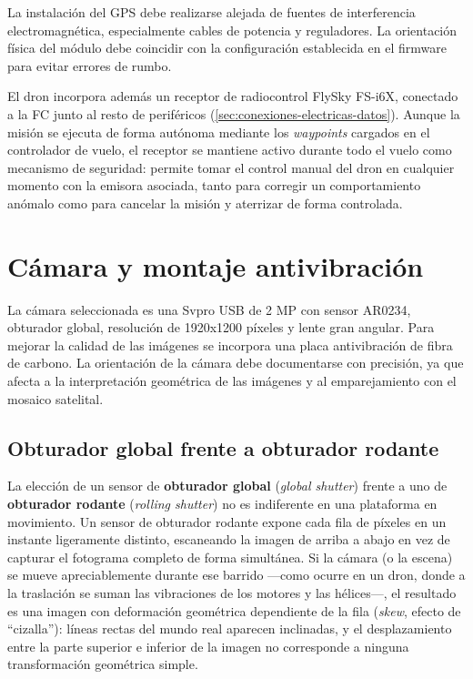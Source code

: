 La instalación del GPS debe realizarse alejada de fuentes de interferencia electromagnética, especialmente cables de potencia y reguladores. La orientación física del módulo debe coincidir con la configuración establecida en el firmware para evitar errores de rumbo.

El dron incorpora además un receptor de radiocontrol FlySky FS-i6X, conectado a la FC junto al resto de periféricos (\autoref{sec:conexiones-electricas-datos}). Aunque la misión se ejecuta de forma autónoma mediante los \textit{waypoints} cargados en el controlador de vuelo, el receptor se mantiene activo durante todo el vuelo como mecanismo de seguridad: permite tomar el control manual del dron en cualquier momento con la emisora asociada, tanto para corregir un comportamiento anómalo como para cancelar la misión y aterrizar de forma controlada.

\section{Cámara y montaje antivibración}
\label{sec:camara-montaje}

La cámara seleccionada es una Svpro USB de 2 MP con sensor AR0234, obturador global, resolución de 1920x1200 píxeles y lente gran angular. Para mejorar la calidad de las imágenes se incorpora una placa antivibración de fibra de carbono. La orientación de la cámara debe documentarse con precisión, ya que afecta a la interpretación geométrica de las imágenes y al emparejamiento con el mosaico satelital.

\subsection{Obturador global frente a obturador rodante}
\label{sec:global-vs-rolling-shutter}

La elección de un sensor de \textbf{obturador global} (\textit{global shutter}) frente a uno de \textbf{obturador rodante} (\textit{rolling shutter}) no es indiferente en una plataforma en movimiento. Un sensor de obturador rodante expone cada fila de píxeles en un instante ligeramente distinto, escaneando la imagen de arriba a abajo en vez de capturar el fotograma completo de forma simultánea. Si la cámara (o la escena) se mueve apreciablemente durante ese barrido —como ocurre en un dron, donde a la traslación se suman las vibraciones de los motores y las hélices—, el resultado es una imagen con deformación geométrica dependiente de la fila (\textit{skew}, efecto de \enquote{cizalla}): líneas rectas del mundo real aparecen inclinadas, y el desplazamiento entre la parte superior e inferior de la imagen no corresponde a ninguna transformación geométrica simple.

